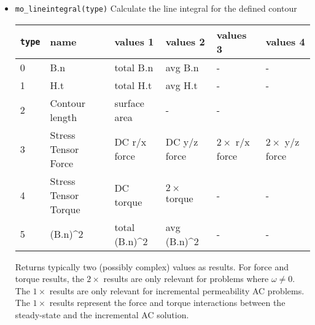 \begin{itemize}
\item{\tt mo\_lineintegral(type)} Calculate the line integral for the defined contour
\begin{small}\begin{center}
\begin{tabular}{llllll}\hline
 {\tt type} & name & values 1 & values 2 & values 3 & values 4 \\  \hline
 0 & B.n & total B.n & avg B.n & - & -\\
 1 & H.t & total H.t & avg H.t & - & - \\
 2 & Contour length & surface area & - & -\\
 3 & Stress Tensor Force & DC r/x force & DC y/z force & $2\times$ r/x force & $2\times$ y/z force \\
 4 & Stress Tensor Torque& DC torque & $2\times$ torque & - & - \\
 5 & (B.n)\^{}2 & total (B.n)\^{}2 & avg (B.n)\^{}2 & - & - \\ \hline
\end{tabular}
\end{center}
\end{small}
Returns typically two (possibly complex) values as results. For force
and torque results, the $2\times$ results are only relevant for
problems where $\omega \neq 0$.  The $1\times$ results are only relevant
for incremental permeability AC problems.  The $1\times$ results represent
the force and torque interactions between the steady-state and the
incremental AC solution.


\end{itemize}
